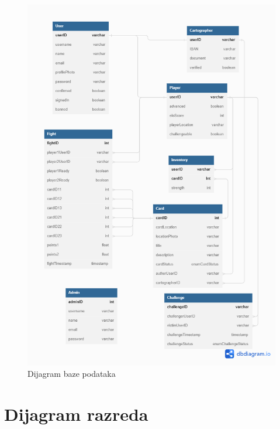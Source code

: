 				\begin{figure}[H]
        			\includegraphics[scale=0.45]{slike/ERdiagram2.png}
        			\centering
        			\caption{Dijagram baze podataka}
        			\label{fig:DBmodel}
        		\end{figure}
			
			\eject
			
			
		\section{Dijagram razreda}
		
			
